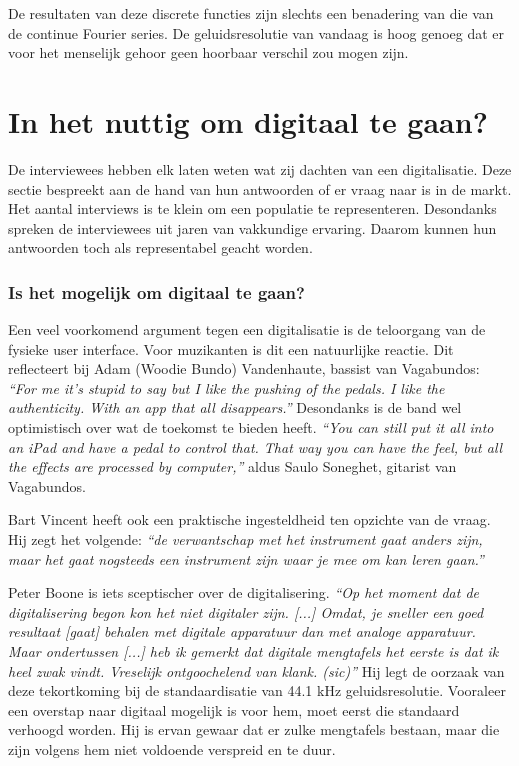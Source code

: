 De resultaten van deze discrete functies zijn slechts een benadering van die van de continue Fourier series. \autocite{fourier} De geluidsresolutie van vandaag is hoog genoeg dat er voor het menselijk gehoor geen hoorbaar verschil zou mogen zijn. \autocite{vagabundos}

\section{In het nuttig om digitaal te gaan?}
\label{onderzoeksvraag2}

De interviewees hebben elk laten weten wat zij dachten van een digitalisatie. Deze sectie bespreekt aan de hand van hun antwoorden of er vraag naar is in de markt. Het aantal interviews is te klein om een populatie te representeren. Desondanks spreken de interviewees uit jaren van vakkundige ervaring. Daarom kunnen hun antwoorden toch als representabel geacht worden.

\subsubsection{Is het mogelijk om digitaal te gaan?}

Een veel voorkomend argument tegen een digitalisatie is de teloorgang van de fysieke user interface. Voor muzikanten is dit een natuurlijke reactie. Dit reflecteert bij Adam (Woodie Bundo) Vandenhaute, bassist van Vagabundos: \textit{``For me it's stupid to say but I like the pushing of the pedals. I like the authenticity. With an app that all disappears.''} \autocite{vagabundos} Desondanks is de band wel optimistisch over wat de toekomst te bieden heeft. \textit{``You can still put it all into an iPad and have a pedal to control that. That way you can have the feel, but all the effects are processed by computer,''} aldus Saulo Soneghet, gitarist van Vagabundos. \autocite{vagabundos}

Bart Vincent heeft ook een praktische ingesteldheid ten opzichte van de vraag. Hij zegt het volgende: \textit{``de verwantschap met het instrument gaat anders zijn, maar het gaat nogsteeds een instrument zijn waar je mee om kan leren gaan.''} \autocite{bartvincent}

Peter Boone is iets sceptischer over de digitalisering. \textit{``Op het moment dat de digitalisering begon kon het niet digitaler zijn. [...] Omdat, je sneller een goed resultaat [gaat] behalen met digitale apparatuur dan met analoge apparatuur. Maar ondertussen [...] heb ik gemerkt dat digitale mengtafels het eerste is dat ik heel zwak vindt. Vreselijk ontgoochelend van klank. (sic)''} \autocite{peterboone} Hij legt de oorzaak van deze tekortkoming bij de standaardisatie van 44.1 kHz geluidsresolutie. Vooraleer een overstap naar digitaal mogelijk is voor hem, moet eerst die standaard verhoogd worden. Hij is ervan gewaar dat er zulke mengtafels bestaan, maar die zijn volgens hem niet voldoende verspreid en te duur. \autocite{peterboone}

